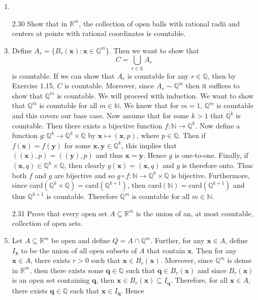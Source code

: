 \documentclass[12pt]{article}
\makeatletter
\theoremstyle{definition}
\theoremstyle{remark}
\renewenvironment{proof}[1][\proofname]{\par
  \pushQED{\qed}%
  \normalfont \topsep6\p@\@plus6\p@\relax
  \list{}{\leftmargin=0mm
          \rightmargin=4mm
          \settowidth{\itemindent}{\itshape#1}%
          \labelwidth=\itemindent
          \parsep=0pt \listparindent=\parindent 
  }
  \item[\hskip\labelsep
        \itshape
    #1\@addpunct{.}]\ignorespaces
}{%
  \popQED\endlist\@endpefalse
}
\let\oldproofname=\proofname
\renewcommand{\proofname}{\bf{\textit{\oldproofname}}}
\makeatother
\begin{document}
\begin{enumerate}[leftmargin=*]
\begin{proof}
                \end{proof}
            \item[2.30] Show that in $\mathbb{R}^m$, the collection of open balls with rational radii and centers at points with rational coordinates is countable.
                \begin{proof}
                    Define $A_r=\{B_r(\mathbf{x})\colon \mathbf{x}\in\mathbb{Q}^m\}$. Then we want to show that 
                        \begin{equation*}
                            C=\bigcup_{r\in\mathbb{Q}} A_r
                        \end{equation*}
                    is countable. If we can show that $A_r$ is countable for any $r\in\mathbb{Q}$, then by Exercise 1.15, $C$ is countable. Moreover, since $A_r\sim\mathbb{Q}^m$ then it suffices to show that $\mathbb{Q}^m$ is countable. We will proceed with induction. We want to show that $\mathbb{Q}^m$ is countable for all $m\in\mathbb{N}$. We know that for $m=1$, $\mathbb{Q}^m$ is countable and this covers our base case. Now assume that for some $k>1$ that $\mathbb{Q}^k$ is countable. Then there exists a bijective function $f\colon \mathbb{N}\rightarrow\mathbb{Q}^k$. Now define a function $g\colon\mathbb{Q}^k\rightarrow\mathbb{Q}^k\times\mathbb{Q}$ by $\mathbf{x}\mapsto(\mathbf{x},p)$, where $p\in\mathbb{Q}$. Then if $f(\mathbf{x})=f(\mathbf{y})$ for some $\mathbf{x},\mathbf{y}\in\mathbb{Q}^k$, this implies that $((\mathbf{x}),p)=((\mathbf{y}),p)$ and thus $\mathbf{x}=\mathbf{y}$. Hence $g$ is one-to-one. Finally, if $(\mathbf{x},q)\in\mathbb{Q}^k\times\mathbb{Q}$, then clearly $g(\mathbf{x})=(\mathbf{x},q)$ and $g$ is therefore onto. Thus both $f$ and $g$ are bijective and so $g\circ f\colon\mathbb{N}\rightarrow\mathbb{Q}^k\times\mathbb{Q}$ is bijective. Furthermore, since card$(\mathbb{Q}^k\times\mathbb{Q})=\text{card}(\mathbb{Q}^{k+1})$, then $\text{card}(\mathbb{N})=\text{card}(\mathbb{Q}^{k+1})$ and thus $\mathbb{Q}^{k+1}$ is countable. Therefore $\mathbb{Q}^m$ is countable for all $m\in\mathbb{N}$.
                \end{proof}
            \item[2.31] Prove that every open set $A\subseteq\mathbb{R}^m$ is the union of an, at most countable, collection of open sets.
                \begin{proof}
                    Let $A\subseteq\mathbb{R}^m$ be open and define $Q=A\cap\mathbb{Q}^m$. Further, for any $\mathbf{x}\in A$, define $I_\mathbf{x}$ to be the union of all open subsets of $A$ that contain $\mathbf{x}$. Then for any $\mathbf{x}\in A$, there exists $r>0$ such that $\mathbf{x}\in B_r(\mathbf{x})$. Moreover, since $\mathbb{Q}^m$ is dense in $\mathbb{R}^m$, then there exists some $\mathbf{q}\in\mathbb Q$ such that $\mathbf{q}\in B_r(\mathbf{x})$ and since $B_r(\mathbf{x})$ is an open set containing $\mathbf{q}$, then $\mathbf{x}\in B_r(\mathbf{x})\subseteq I_{\mathbf{q}}$. Therefore, for all $\mathbf{x}\in A$, there exists $\mathbf{q}\in\mathbb Q$ such that $\mathbf{x}\in I_{\mathbf{q}}$. Hence

\end{proof}
\end{enumerate}
\end{document}
